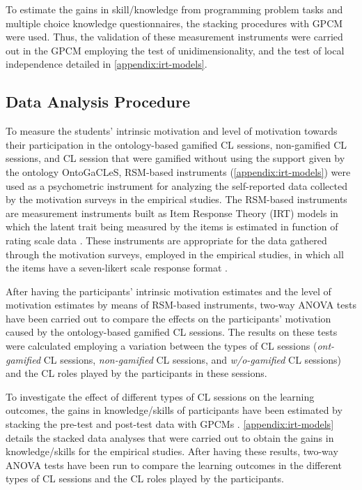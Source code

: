To estimate the gains in skill/knowledge from programming problem tasks and multiple choice knowledge questionnaires, the stacking procedures with GPCM were used. Thus, the validation of these measurement instruments were carried out in the GPCM employing the test of unidimensionality, and the test of local independence detailed in \autoref{appendix:irt-models}.

\subsection{Data Analysis Procedure}
\label{sec:evaluation-analysis-procedure}

To measure the students' intrinsic motivation and level of motivation towards their participation in the ontology-based gamified CL sessions, non-gamified CL sessions, and CL session that were gamified without using the support given by the ontology OntoGaCLeS, RSM-based instruments (\autoref{appendix:irt-models}) were used as a psychometric instrument for analyzing the self-reported data collected by the motivation surveys in the empirical studies. The RSM-based instruments are measurement instruments built as Item Response Theory (IRT) models in which the latent trait being measured by the items is estimated in function of rating scale data \cite{George2005}. These instruments are appropriate for the data gathered through the motivation surveys, employed in the empirical studies, in which all the items have a seven-likert scale response format \cite{van2013handbook}.

After having the participants' intrinsic motivation estimates and the level of motivation estimates by means of RSM-based instruments, two-way ANOVA tests have been carried out to compare the effects on the participants' motivation caused by the ontology-based gamified CL sessions. The results on these tests were calculated employing a variation between the types of CL sessions (\emph{ont-gamified} CL sessions, \emph{non-gamified} CL sessions, and \emph{w/o-gamified} CL sessions) and the CL roles played by the participants in these sessions.

To investigate the effect of different types of CL sessions on the learning outcomes, the gains in knowledge/skills of participants have been estimated by stacking the pre-test and post-test data with GPCMs \cite{Wright2003}. \autoref{appendix:irt-models} details the stacked data analyses that were carried out to obtain the gains in knowledge/skills for the empirical studies.
After having these results, two-way ANOVA tests have been run to compare the learning outcomes in the different types of CL sessions and the CL roles played by the participants.

